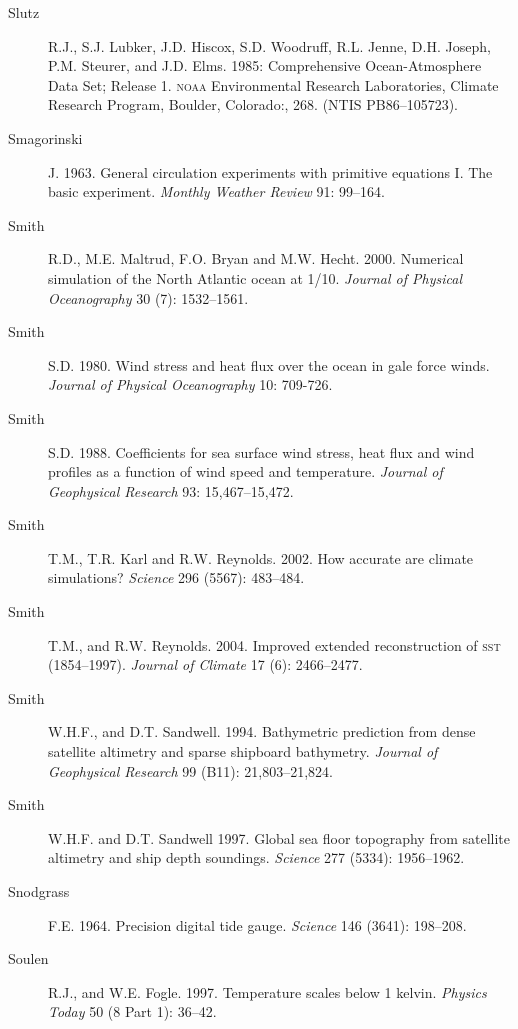 \begin{description}
\item [Slutz]R.J., S.J. Lubker, J.D. Hiscox, S.D. Woodruff,
  R.L. Jenne, D.H. Joseph, P.M. Steurer, and J.D. Elms. 1985:
  Comprehensive Ocean-Atmosphere Data Set; Release 1. \textsc{noaa}
  Environmental Research Laboratories, Climate Research Program,
  Boulder, Colorado:, 268. (NTIS PB86--105723).

\item [Smagorinski]J. 1963. General circulation experiments with
  primitive equations I. The basic experiment. \textit{Monthly Weather
    Review} 91: 99--164.

\item [Smith]R.D., M.E. Maltrud, F.O. Bryan and
  M.W. Hecht. 2000. Numerical simulation of the North Atlantic ocean
  at 1/10\degrees. \textit{Journal of Physical Oceanography} 30 (7):
  1532--1561.

\item [Smith]S.D. 1980. Wind stress and heat flux over the ocean in
  gale force winds. \textit{Journal of Physical Oceanography} 10:
  709-726.

\item [Smith]S.D. 1988. Coefficients for sea surface wind stress, heat
  flux and wind profiles as a function of wind speed and
  temperature. \textit{Journal of Geophysical Research} 93:
  15,467--15,472.

\item [Smith]T.M., T.R. Karl and R.W. Reynolds. 2002. How accurate are
  climate simulations? \textit{Science} 296 (5567): 483--484.

\item [Smith]T.M., and R.W. Reynolds. 2004. Improved extended
  reconstruction of \textsc{sst} (1854--1997). \textit{Journal of
    Climate} 17 (6): 2466--2477.

\item [Smith]W.H.F., and D.T. Sandwell. 1994. Bathymetric prediction
  from dense satellite altimetry and sparse shipboard
  bathymetry. \textit{Journal of Geophysical Research} 99 (B11):
  21,803--21,824.

\item [Smith]W.H.F. and D.T. Sandwell 1997. Global sea floor
  topography from satellite altimetry and ship depth
  soundings. \textit{Science} 277 (5334): 1956--1962.

\item[Snodgrass]F.E. 1964. Precision digital tide
  gauge. \textit{Science} 146 (3641): 198--208.

\item [Soulen]R.J., and W.E. Fogle. 1997. Temperature scales below 1
  kelvin. \textit{Physics Today} 50 (8 Part 1): 36--42.


\end{description}
